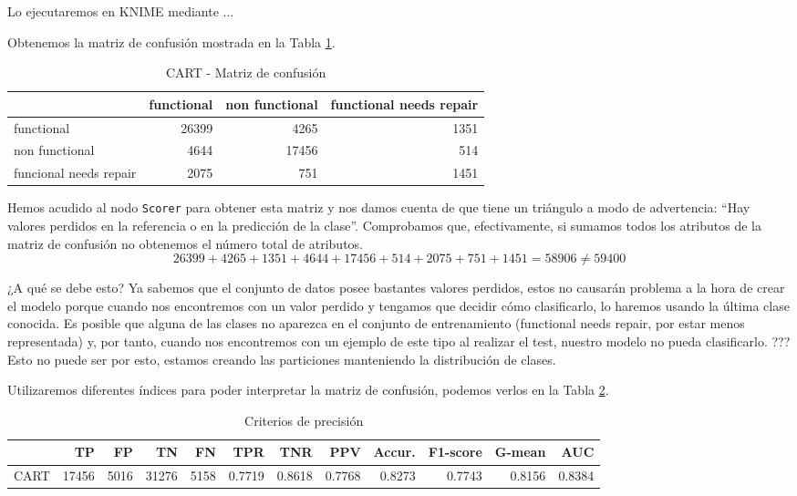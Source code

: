 \documentclass[a4paper, 20pt]{article}
\begin{document}
Lo ejecutaremos en KNIME mediante ... %

Obtenemos la matriz de confusión mostrada en la Tabla \ref{tab:CMTree}.

\begin{table}[H]
  \centering
  \caption{CART - Matriz de confusión}
  \label{tab:CMTree}
  \begin{tabular}{lrrr}
    \toprule
    & functional & non functional & functional needs repair\\ \midrule
    functional & 26399 & 4265 & 1351\\
    non functional & 4644 & 17456 & 514\\
    funcional needs repair & 2075 & 751 & 1451\\
    \bottomrule
  \end{tabular}
\end{table}

Hemos acudido al nodo \texttt{Scorer} para obtener esta matriz y nos damos cuenta de que tiene un triángulo a modo de advertencia: ``Hay valores perdidos en la referencia o en la predicción de la clase''. Comprobamos que, efectivamente, si sumamos todos los atributos de la matriz de confusión no obtenemos el número total de atributos.
\[26399 + 4265 + 1351 + 4644 + 17456 + 514 + 2075 + 751 + 1451 = 58906 \neq 59400
\]

¿A qué se debe esto? Ya sabemos que el conjunto de datos posee bastantes valores perdidos, estos no causarán problema a la hora de crear el modelo porque cuando nos encontremos con un valor perdido y tengamos que decidir cómo clasificarlo, lo haremos usando la última clase conocida. Es posible que alguna de las clases no aparezca en el conjunto de entrenamiento (functional needs repair, por estar menos representada) y, por tanto, cuando nos encontremos con un ejemplo de este tipo al realizar el test, nuestro modelo no pueda clasificarlo. ??? Esto no puede ser por esto, estamos creando las particiones manteniendo la distribución de clases.

Utilizaremos diferentes índices para poder interpretar la matriz de confusión, podemos verlos en la Tabla \ref{tab:Tree}. 

\begin{table}[H]
\centering
\caption{Criterios de precisión}
\label{tab:Tree}
\begin{tabular}{lrrrrrrrrrrr}
\toprule
 & TP & FP & TN & FN & TPR & TNR & PPV & Accur. & F1-score & G-mean & AUC\\ \midrule
CART & 17456 & 5016 & 31276 & 5158 & 0.7719 & 0.8618 & 0.7768 & 0.8273 & 0.7743 & 0.8156 & 0.8384\\
\bottomrule
\end{tabular}
\end{table}
\end{document}
